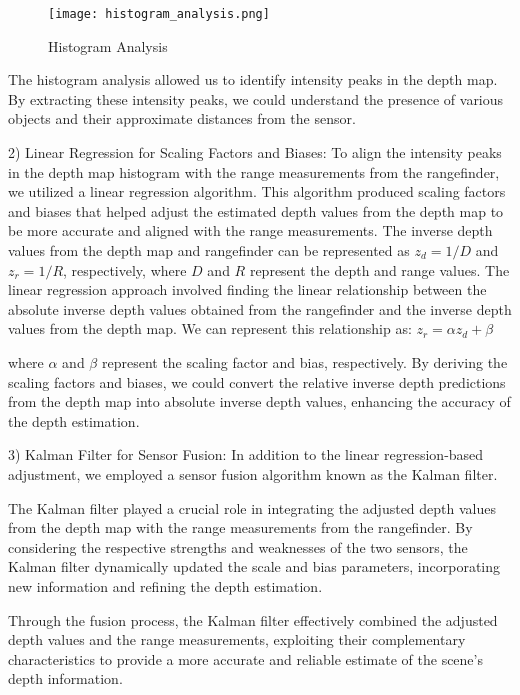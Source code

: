 \documentclass[conference]{IEEEtran}
\begin{document}
\begin{figure}[htbp]
    \centering
    \texttt{[image: histogram\_analysis.png]}
    \caption{Histogram Analysis}
    \label{fig:Histogram Analysis}
\end{figure}

The histogram analysis allowed us to identify intensity peaks in the depth map. By extracting these intensity peaks, we could understand the presence of various objects and their approximate distances from the sensor.


2) Linear Regression for Scaling Factors and Biases:
To align the intensity peaks in the depth map histogram with the range measurements from the rangefinder, we utilized a linear regression algorithm. This algorithm produced scaling factors and biases that helped adjust the estimated depth values from the depth map to be more accurate and aligned with the range measurements.
The inverse depth values from the depth map and rangefinder can be represented as $z_{d} = 1/D$ and $z_{r} = 1/R$, respectively, where $D$ and $R$ represent the depth and range values. The linear regression approach involved finding the linear relationship between the absolute inverse depth values obtained from the rangefinder and the inverse depth values from the depth map. We can represent this relationship as:
$z_r=\alpha z_d+\beta$

where $\alpha$ and $\beta$ represent the scaling factor and bias, respectively. By deriving the scaling factors and biases, we could convert the relative inverse depth predictions from the depth map into absolute inverse depth values, enhancing the accuracy of the depth estimation.

3) Kalman Filter for Sensor Fusion:
In addition to the linear regression-based adjustment, we employed a sensor fusion algorithm known as the Kalman filter. 

The Kalman filter played a crucial role in integrating the adjusted depth values from the depth map with the range measurements from the rangefinder. By considering the respective strengths and weaknesses of the two sensors, the Kalman filter dynamically updated the scale and bias parameters, incorporating new information and refining the depth estimation.

Through the fusion process, the Kalman filter effectively combined the adjusted depth values and the range measurements, exploiting their complementary characteristics to provide a more accurate and reliable estimate of the scene's depth information.
\end{document}
